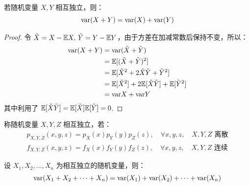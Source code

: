 \begin{theorem}
若随机变量 $X,Y$ 相互独立，则：
\[
\mathrm{var}(X+Y)=\mathrm{var}(X)+\mathrm{var}(Y)
\]
\end{theorem}
\begin{proof}
令 $\tilde X=X-\mathbb{E} X,\,\tilde Y=Y-\mathbb{E} Y$，由于方差在加减常数后保持不变，所以：
\begin{align*}
\mathrm{var}(X+Y)&=\mathrm{var}(\tilde X+\tilde Y)\\
&=\mathbb{E}[(\tilde X+\tilde Y)^2]\\
&=\mathbb{E}[{\tilde X}^2+2\tilde X\tilde Y+{\tilde Y}^2]\\
&=\mathbb{E}[{\tilde X}^2]+2\mathbb{E}[\tilde X\tilde Y]+\mathbb{E}[{\tilde Y}^2]\\
&=\mathrm{var} X+\mathrm{var} Y
\end{align*}
其中利用了 $\mathbb{E}[\tilde X\tilde Y]=\mathbb{E}[\tilde X]\mathbb{E}[\tilde Y]=0$.
\end{proof}

\begin{definition}[多个随机变量独立性]
称随机变量 $X,Y,Z$ 相互独立，若：
\begin{gather*}
p_{X,Y,Z}(x,y,z)=p_X(x)p_Y(y)p_Z(z),\quad\forall x,y,z,\quad\text{$X,Y,Z$ 离散}\\
f_{X,Y,Z}(x,y,z)=f_X(x)f_Y(y)f_Z(z),\quad\forall x,y,z,\quad\text{$X,Y,Z$ 连续}
\end{gather*}
\end{definition}

\begin{theorem}[多个独立随机变量和的方差]
设 $X_1,X_2,\ldots,X_n$ 为相互独立的随机变量，则：
\[
\mathrm{var}(X_1+X_2+\cdots+X_n)=\mathrm{var}(X_1)+\mathrm{var}(X_2)+\cdots+\mathrm{var}(X_n)
\]
\end{theorem}




